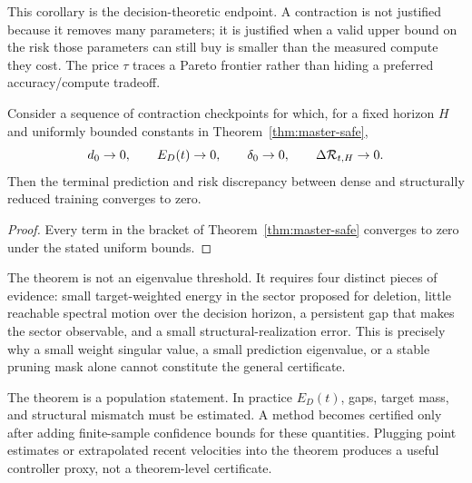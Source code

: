\begin{remark}
This corollary is the decision-theoretic endpoint. A contraction is not justified because it removes many parameters; it is justified when a valid upper bound on the risk those parameters can still buy is smaller than the measured compute they cost. The price $\tau$ traces a Pareto frontier rather than hiding a preferred accuracy/compute tradeoff.
\end{remark}

\begin{corollary}\label{cor:asymptotic-safe}
Consider a sequence of contraction checkpoints for which, for a fixed horizon $H$ and uniformly bounded constants in Theorem~\ref{thm:master-safe},
\[
d_0\to0,
\qquad
E_D(t)\to0,
\qquad
\delta_0\to0,
\qquad
\Delta\mathcal R_{t,H}\to0.
\]
Then the terminal prediction and risk discrepancy between dense and structurally reduced training converges to zero.
\end{corollary}

\begin{proof}
Every term in the bracket of Theorem~\ref{thm:master-safe} converges to zero under the stated uniform bounds.
\end{proof}

\begin{remark}
The theorem is not an eigenvalue threshold. It requires four distinct pieces of evidence: small target-weighted energy in the sector proposed for deletion, little reachable spectral motion over the decision horizon, a persistent gap that makes the sector observable, and a small structural-realization error. This is precisely why a small weight singular value, a small prediction eigenvalue, or a stable pruning mask alone cannot constitute the general certificate.
\end{remark}

\begin{remark}
The theorem is a population statement. In practice $E_D(t)$, gaps, target mass, and structural mismatch must be estimated. A method becomes certified only after adding finite-sample confidence bounds for these quantities. Plugging point estimates or extrapolated recent velocities into the theorem produces a useful controller proxy, not a theorem-level certificate.
\end{remark}
